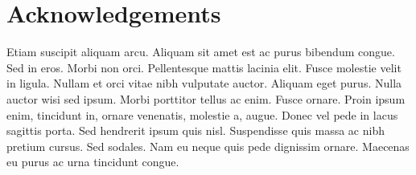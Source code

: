 \chapter{Acknowledgements}
Etiam suscipit aliquam arcu. Aliquam sit amet est ac purus bibendum congue. Sed in eros. Morbi non orci. Pellentesque mattis lacinia elit. Fusce molestie velit in ligula. Nullam et orci vitae nibh vulputate auctor. Aliquam eget purus. Nulla auctor wisi sed ipsum. Morbi porttitor tellus ac enim. Fusce ornare. Proin ipsum enim, tincidunt in, ornare venenatis, molestie a, augue. Donec vel pede in lacus sagittis porta. Sed hendrerit ipsum quis nisl. Suspendisse quis massa ac nibh pretium cursus. Sed sodales. Nam eu neque quis pede dignissim ornare. Maecenas eu purus ac urna tincidunt congue.
